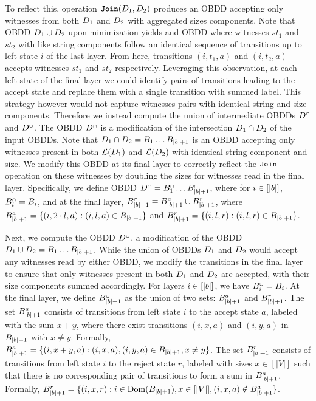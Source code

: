 To reflect this, operation $\texttt{\textbf{Join}}(D_1,D_2) $ produces an OBDD accepting only witnesses from both $D_1$ and $D_2$ with aggregated sizes components. Note that OBDD $D_1 \cup D_2$ upon minimization yields and OBDD where witnesses $st_1$ and $st_2$ with like string components follow an identical sequence of transitions up to left state $i$ of the last layer. From here, transitions $(i,t_1,a)$ and $(i,t_2,a)$ accepts witnesses $st_1$ and $st_2$ respectively. Leveraging this observation, at each left state of the final layer we could identify pairs of transitions leading to the accept state and replace them with a single transition with summed label. This strategy however would not capture witnesses pairs with identical string and size components.
Therefore we instead compute the union of intermediate OBDDs $D^{{\scriptscriptstyle\cap}}$ and $D^{{\scriptscriptstyle\cup}}$. The OBDD $D^{{\scriptscriptstyle\cap}}$ is a modification of the intersection $D_1 \cap D_2$ of the input OBDDs. Note that $D_1 \cap D_2 = B_1\ldots B_{|b|+1}$ is an OBDD accepting only witnesses present in both $\mathcal{L}(D_1)$ and $\mathcal{L}(D_2)$ with identical string component and size. We modify this OBDD at its final layer to correctly reflect the $\texttt{Join}$ operation on these witnesses by doubling the sizes for witnesses read in the final layer. Specifically, we define OBDD $D^{{\scriptscriptstyle\cap}} = B_1^{{\scriptscriptstyle\cap}}\ldots B_{|b|+1}^{{\scriptscriptstyle\cap}}$, where for $i \in [|b|]$, $B_i^{{\scriptscriptstyle\cap}} = B_i$, and at the final layer, $B_{|b|+1}^{{\scriptscriptstyle\cap}} = B_{|b|+1}^a \cup B_{|b|+1}^r$, where $B_{|b|+1}^a = \{(i,2 \cdot l,a): (i,l,a)\in B_{|b|+1}\}$ and $B_{|b|+1}^r = \{(i,l,r): (i,l,r)\in B_{|b|+1}\}$. 

Next, we compute the OBDD $D^{{\scriptscriptstyle\cup}}$, a modification of the OBDD $D_1 \cup D_2= B_1\ldots B_{|b|+1}$. While the union of OBDDs $D_1$ and $D_2$ would accept any witnesses read by either OBDD, we modify the transitions in the final layer to ensure that only witnesses present in both $D_1$ and $D_2$ are accepted, with their size components summed accordingly. 
For layers $i \in [|b|]$, we have $B_i^{{\scriptscriptstyle\cup}} = B_i$. At the final layer, we define $B_{|b|+1}^{{\scriptscriptstyle\cup}}$ as the union of two sets: $B_{|b|+1}^a$ and $B_{|b|+1}^r$. The set $B_{|b|+1}^a$ consists of transitions from left state $i$ to the accept state $a$, labeled with the sum $x + y$, where there exist transitions $(i,x,a)$ and $(i,y,a)$ in $B_{|b|+1}$ with $x \neq y$. Formally, $B_{|b|+1}^a = \{(i,x + y,a): (i,x,a),(i,y,a)\in B_{|b|+1}, x\neq y\}$. The set $B_{|b|+1}^r$ consists of transitions from left state $i$ to the reject state $r$, labeled with sizes $x \in [|V|]$ such that there is no corresponding pair of transitions to form a sum in $B_{|b|+1}^a$. Formally, $B_{|b|+1}^r = \{(i,x,r): i \in \mathrm{Dom}(B_{|b|+1}), x \in [|V|], (i,x,a) \notin B_{|b|+1}^a\}$.

